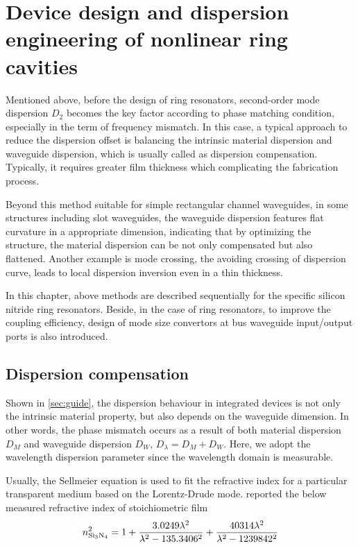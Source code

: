 
\chapter{Device design and dispersion engineering of nonlinear ring cavities}

Mentioned above, before the design of ring resonators, second-order mode dispersion $ D_2 $ becomes the key factor according to phase matching condition, especially in the term of frequency mismatch. In this case, a typical approach to reduce the dispersion offset is balancing the intrinsic material dispersion and waveguide dispersion, which is usually called as dispersion compensation. Typically, it requires greater film thickness which complicating the fabrication process. 

Beyond this method suitable for simple rectangular channel waveguides, in some structures including slot waveguides, the waveguide dispersion features flat curvature in a appropriate dimension, indicating that by optimizing the structure, the material dispersion can be not only compensated but also flattened. Another example is mode crossing, the avoiding crossing of dispersion curve, leads to local dispersion inversion even in a thin thickness. 

In this chapter, above methods are described sequentially for the specific silicon nitride ring resonators. Beside, in the case of ring resonators, to improve the coupling efficiency, design of mode size convertors at bus waveguide input/output ports is also introduced.

\section{Dispersion compensation}\label{sec:disp-comp}
Shown in \autoref{sec:guide}, the dispersion behaviour in integrated devices is not only the intrinsic material property, but also depends on the waveguide dimension. In other words, the phase mismatch occurs as a result of both material dispersion $D_M$ and waveguide dispersion $ D_W $, $D_{\lambda}= D_M + D_W$. Here, we adopt the wavelength dispersion parameter since the wavelength domain is measurable.

Usually, the Sellmeier equation is used to fit the refractive index for a particular transparent medium based on the Lorentz-Drude mode. \citeauthor{Luke2015a} reported the below measured refractive index of stoichiometric  film \cite{Luke2015a}
\begin{equation}\label{eq:si3n4-selleimeier}
    n_{\ce{Si3N4}}^2 = 1 + \frac{3.0249 \lambda^2}{\lambda^2-135.3406^2} + \frac{40314 \lambda^2}{\lambda^2 - 1239842^2}
\end{equation}

